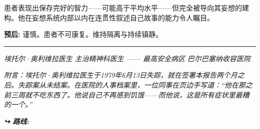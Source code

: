 \noindent 患者表现出保存完好的智力——可能高于平均水平——但完全被导向其妄想的建构。他在妄想系统内部以内在连贯性叙述自己故事的能力令人瞩目。

\noindent \textbf{预后:} 谨慎。患者不可康复。维持隔离与持续镇静。

\vspace{0.5em}\noindent\rule{\textwidth}{0.5pt}\vspace{0.5em}

\noindent \textit{埃托尔·奥利维拉医生}
\textit{主治精神科医生 —— 最高安全病区}
\textit{巴尔巴塞纳收容医院}

\vspace{0.5em}
\noindent \textit{附言：埃托尔·奥利维拉医生于1979年6月13日失踪，就在签署本报告两个月之后。失踪案从未结案。在医院的人事档案里，一位同事在页边手写道：\textquotedblleft{}他在那之前三周就不吃东西了。他说自己不再感到饥饿——而他说，这是所有症状里最糟的一个。\textquotedblright{}}

\noindent\textit{\textbf{↪ 路线:}  \rotasep {}}
